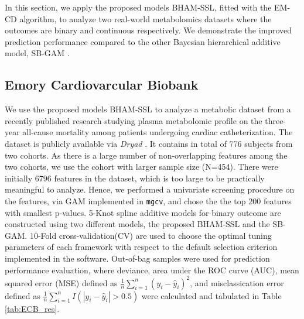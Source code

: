 \documentclass[AMA,STIX1COL,]{WileyNJD-v2}
\begin{document}
\label{sec:real_data}

In this section, we apply the proposed models BHAM-SSL, fitted with the
EM-CD algorithm, to analyze two real-world metabolomics datasets where
the outcomes are binary and continuous respectively. We demonstrate the
improved prediction performance compared to the other Bayesian
hierarchical additive model, SB-GAM \citep{Bai2021}.

\hypertarget{emory-cardiovarcular-biobank}{%
\subsection{Emory Cardiovarcular
Biobank}\label{emory-cardiovarcular-biobank}}

We use the proposed models BHAM-SSL to analyze a metabolic dataset from
a recently published research \citep{Mehta2020} studying plasma
metabolomic profile on the three-year all-cause mortality among patients
undergoing cardiac catheterization. The dataset is publicly available
via \textit{Dryad} \citep{Mehta2020_data}. It contains in total of 776
subjects from two cohorts. As there is a large number of non-overlapping
features among the two cohorts, we use the cohort with larger sample
size (N=454). There were initially 6796 features in the dataset, which
is too large to be practically meaningful to analyze. Hence, we
performed a univariate screening procedure on the features, via GAM
implemented in \texttt{mgcv}, and chose the the top 200 features with
smallest p-values. 5-Knot spline additive models for binary outcome are
constructed using two different models, the proposed BHAM-SSL and the
SB-GAM. 10-Fold cross-validation(CV) are used to choose the optimal
tuning parameters of each framework with respect to the default
selection criterion implemented in the software. Out-of-bag samples were
used for prediction performance evaluation, where deviance, area under
the ROC curve (AUC), mean squared error (MSE) defined as
\(\frac{1}{n}\sum\limits^{n}_{i=1}(y_i - \hat y_i)^2\), and
misclassication error defined as
\(\frac{1}{n}\sum\limits^{n}_{i=1}I(|y_i - \hat y_i|>0.5)\) were
calculated and tabulated in Table \ref{tab:ECB_res}.

\providecommand{\docline}[3]{\noalign{\global\setlength{\arrayrulewidth}{#1}}\arrayrulecolor[HTML]{#2}\cline{#3}}

\setlength{\tabcolsep}{2pt}

\renewcommand*{\arraystretch}{1.5}
\end{document}
